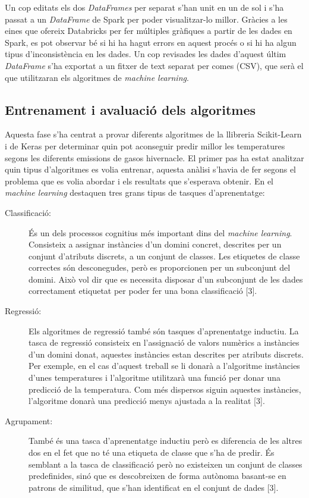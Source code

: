 \documentclass[10pt,a4paper,twocolumn,twoside]{article}
\begin{document}
Un cop editats els dos \textit{DataFrames} per separat s'han unit en un de sol i s'ha passat a un \textit{DataFrame} de Spark per poder visualitzar-lo millor. Gràcies a les eines que ofereix Databricks per fer múltiples gràfiques a partir de les dades en Spark, es pot observar bé si hi ha hagut errors en aquest procés o si hi ha algun tipus d'inconsistència en les dades. Un cop revisades les dades d'aquest últim \textit{DataFrame} s'ha exportat a un fitxer de text separat per comes (CSV), que serà el que utilitzaran els algoritmes de \textit{machine learning}.

\subsection{Entrenament i avaluació dels algoritmes}
Aquesta fase s'ha centrat a provar diferents algoritmes de la llibreria Scikit-Learn i de Keras per determinar quin pot aconseguir predir millor les temperatures segons les diferents emissions de gasos hivernacle. El primer pas ha estat analitzar quin tipus d'algoritmes es volia entrenar, aquesta anàlisi s'havia de fer segons el problema que es volia abordar i els resultats que s'esperava obtenir. En el \textit{machine learning} destaquen tres grans tipus de tasques d'aprenentatge:

\begin{description}
\item[Classificació:] És un dels processos cognitius més important dins del \textit{machine learning}. Consisteix a assignar instàncies d'un domini concret, descrites per un conjunt d'atributs discrets, a un conjunt de classes. Les etiquetes de classe correctes són desconegudes, però es proporcionen per un subconjunt del domini. Això vol dir que es necessita disposar d'un subconjunt de les dades correctament etiquetat per poder fer una bona classificació [3].
\item[Regressió:] Els algoritmes de regressió també són tasques d'aprenentatge inductiu. La tasca de regressió consisteix en l'assignació de valors numèrics a instàncies d'un domini donat, aquestes instàncies estan descrites per atributs discrets. Per exemple, en el cas d'aquest treball se li donarà a l'algoritme instàncies d'unes temperatures i l'algoritme utilitzarà una funció per donar una predicció de la temperatura. Com més dispersos siguin aquestes instàncies, l'algoritme donarà una predicció menys ajustada a la realitat [3].
\item[Agrupament:] També és una tasca d'aprenentatge inductiu però es diferencia de les altres dos en el fet que no té una etiqueta de classe que s'ha de predir. És semblant a la tasca de classificació però no existeixen un conjunt de classes predefinides, sinó que es descobreixen de forma autònoma basant-se en patrons de similitud, que s'han identificat en el conjunt de dades [3].
\end{description}
\end{document}
